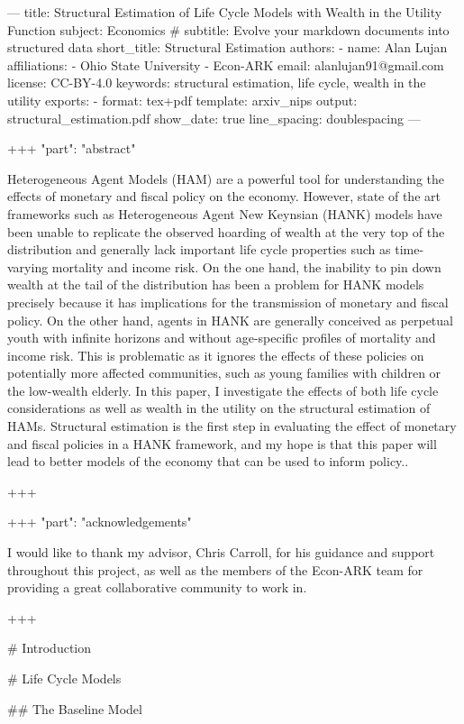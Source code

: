 ---
title: Structural Estimation of Life Cycle Models with Wealth in the Utility Function
subject: Economics
# subtitle: Evolve your markdown documents into structured data
short_title: Structural Estimation
authors:
- name: Alan Lujan
affiliations:
- Ohio State University
- Econ-ARK
email: alanlujan91@gmail.com
license: CC-BY-4.0
keywords: structural estimation, life cycle, wealth in the utility
exports:
- format: tex+pdf
template: arxiv_nips
output: structural_estimation.pdf
show_date: true
line_spacing: doublespacing
---

+++ {"part": "abstract"}

Heterogeneous Agent Models (HAM) are a powerful tool for understanding the effects of monetary and fiscal policy on the economy. However, state of the art frameworks such as Heterogeneous Agent New Keynsian (HANK) models have been unable to replicate the observed hoarding of wealth at the very top of the distribution and generally lack important life cycle properties such as time-varying mortality and income risk. On the one hand, the inability to pin down wealth at the tail of the distribution has been a problem for HANK models precisely because it has implications for the transmission of monetary and fiscal policy. On the other hand, agents in HANK are generally conceived as perpetual youth with infinite horizons and without age-specific profiles of mortality and income risk. This is problematic as it ignores the effects of these policies on potentially more affected communities, such as young families with children or the low-wealth elderly. In this paper, I investigate the effects of both life cycle considerations as well as wealth in the utility on the structural estimation of HAMs. Structural estimation is the first step in evaluating the effect of monetary and fiscal policies in a HANK framework, and my hope is that this paper will lead to better models of the economy that can be used to inform policy..

+++

+++ {"part": "acknowledgements"}

I would like to thank my advisor, Chris Carroll, for his guidance and support throughout this project, as well as the members of the Econ-ARK team for providing a great collaborative community to work in.

+++

# Introduction

# Life Cycle Models

## The Baseline Model

